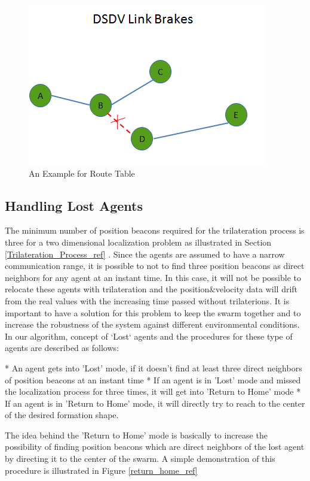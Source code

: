 \begin{figure}[H]
\caption{An Example for Route Table} \label{linkk_brake}
\centering
\includegraphics[scale = 0.65]{link_break}
\end{figure}
	
\subsection{Handling Lost Agents} \label{LostAgents}
The minimum number of position beacons required for the trilateration process is three for a two dimensional localization problem as illustrated in Section \ref{Trilateration_Process_ref} . Since the agents are assumed to have a narrow communication range, it is possible to not to find three  position beacons as direct neighbors for any agent at an instant time. In this case, it will not be possible to relocate these agents with trilateration and the position$\&$velocity data will drift from the real values with the increasing time passed without trilaterions. It is important to have a solution for this problem to keep the swarm together and to increase the robustness of the system against different environmental conditions. In our algorithm, concept of `Lost` agents and the procedures for these type of agents are described as follows:
	
	* An agent gets into 'Lost' mode, if it doesn't find at least three direct neighbors of position beacons at an instant time \newline
	* If an agent is in 'Lost' mode and missed the localization process for three times, it will get into 'Return to Home' mode \newline
	* If an agent is in 'Return to Home' mode, it will directly try to reach to the center of the desired formation shape.
		
The idea behind the 'Return to Home' mode is basically to increase the possibility of finding position beacons which are direct neighbors of the lost agent by directing it to the center of the swarm. A simple demonstration of this procedure is illustrated in Figure \ref{return_home_ref}
	
